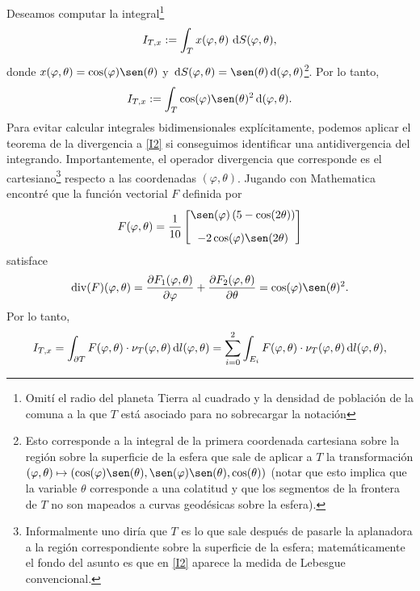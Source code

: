 \documentclass[reqno]{amsart}
\newcommand{\dd}[1][y]{\if#1y\,\fi{\mathrm d}} %
\begin{document}
Deseamos computar la integral\footnote{Omití el radio del planeta Tierra al cuadrado y la densidad de población de la comuna a la que $T$ está asociado para no sobrecargar la notación}
%
\begin{equation}\label{I1}
I_{T,x} := \int_T x(\varphi, \theta) \, \dd S(\varphi, \theta),
\end{equation}
%
donde $x(\varphi,\theta) = \cos(\varphi) \sen(\theta)$ y $\dd S(\varphi, \theta) = \sen(\theta) \dd(\varphi,\theta)$\footnote{Esto corresponde a la integral de la primera coordenada cartesiana sobre la región sobre la superficie de la esfera que sale de aplicar a $T$ la transformación $(\varphi, \theta) \mapsto (\cos(\varphi) \sen(\theta), \sen(\varphi) \sen(\theta), \cos(\theta))$ (notar que esto implica que la variable $\theta$ corresponde a una colatitud y que los segmentos de la frontera de $T$ no son mapeados a curvas geodésicas sobre la esfera).}.
Por lo tanto,
%
\begin{equation}\label{I2}
I_{T,x} := \int_T \cos(\varphi) \sen(\theta)^2 \dd(\varphi, \theta).
\end{equation}
%
Para evitar calcular integrales bidimensionales explícitamente, podemos aplicar el teorema de la divergencia a \eqref{I2} si conseguimos identificar una antidivergencia del integrando.
Importantemente, el operador divergencia que corresponde es el cartesiano\footnote{Informalmente uno diría que $T$ es lo que sale después de pasarle la aplanadora a la región correspondiente sobre la superficie de la esfera; matemáticamente el fondo del asunto es que en \eqref{I2} aparece la medida de Lebesgue convencional.} respecto a las coordenadas $(\varphi, \theta)$.
Jugando con Mathematica encontré que la función vectorial $F$ definida por
%
\begin{equation}\label{F}
F(\varphi, \theta) = \frac{1}{10}\begin{bmatrix}
\sen(\varphi) \left( 5 - \cos(2\theta) \right)\\[2ex]
-2 \cos(\varphi) \sen(2\theta)
\end{bmatrix}
\end{equation}
%
satisface
%
\begin{equation*}
\operatorname{div}(F)(\varphi,\theta)
= \frac{\partial F_1(\varphi, \theta)}{\partial \varphi} + \frac{\partial F_2(\varphi, \theta)}{\partial \theta}
= \cos(\varphi) \sen(\theta)^2.
\end{equation*}
%
Por lo tanto,
%
\begin{equation}\label{I3}
I_{T,x} = \int_{\partial T} F(\varphi, \theta) \cdot \nu_T(\varphi,\theta) \dd l(\varphi, \theta)
= \sum_{i=0}^2 \int_{E_i} F(\varphi, \theta) \cdot \nu_T(\varphi,\theta) \dd l(\varphi, \theta),
\end{equation}
\end{document}
